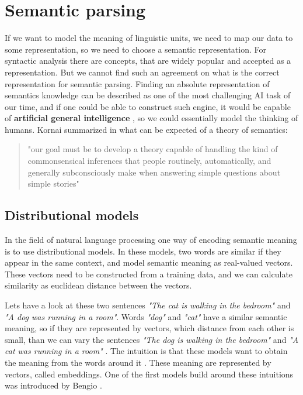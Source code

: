 \section{Semantic parsing}
If we want to model the meaning of linguistic units, we need to map our data to some representation, so we need to choose a semantic representation. For syntactic analysis there are concepts, that are widely popular and accepted as a representation. But we cannot find such an agreement on what is the correct representation for semantic parsing.
Finding an absolute representation of semantics knowledge can be described as one of the most challenging AI task of our time, and if one could be able to construct such engine, it would be capable of \textbf{artificial general intelligence} \cite{Kornai:2018}, so we could essentially model the thinking of humans. Kornai summarized in \cite{Kornai:2018} what can be expected of a theory of semantics:
\begin{quotation}
	"our goal must be to develop a theory capable of handling the kind of commonsensical inferences that people routinely, automatically, and generally subconsciously make when answering simple questions about simple stories"
\end{quotation}

\subsection{Distributional models}
In the field of natural language processing one way of encoding semantic meaning is to use distributional models. In these models, two words are similar if they appear in the same context, and model semantic meaning as real-valued vectors. These vectors need to be constructed from a training data, and we can calculate similarity as euclidean distance between the vectors.

Lets have a look at these two sentences \textit{"The cat is walking in the bedroom"} and \textit{"A dog was running in a room"}. Words \textit{"dog"} and \textit{"cat"} have a similar semantic meaning, so if they are represented by vectors, which distance from each other is small, than we can vary the sentences \textit{"The dog is walking in the bedroom"} and \textit{"A cat was running in a room"} \cite{Bengio:2003}. The intuition is that these models want to obtain the meaning from the words around it \cite{Jurafsky:2018}. These meaning are represented by vectors, called embeddings. One of the first models build around these intuitions was introduced by Bengio \cite{Bengio:2003}. 

